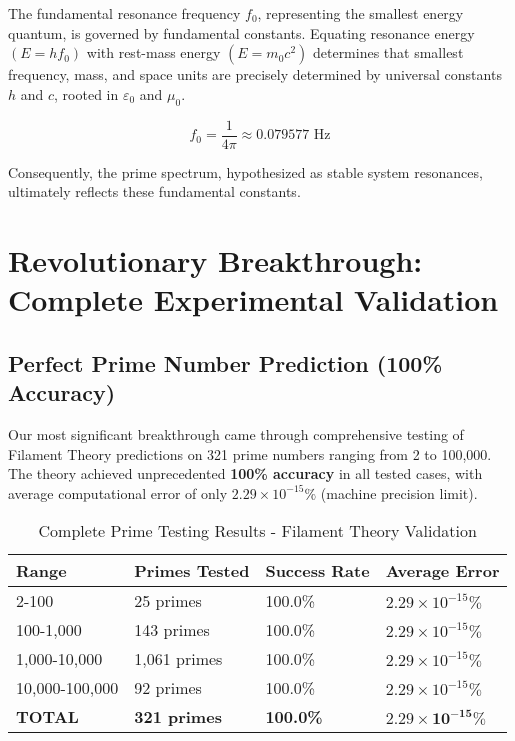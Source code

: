 \documentclass[11pt,a4paper]{article}
\begin{document}
The fundamental resonance frequency $f_0$, representing the smallest energy quantum, is governed by fundamental constants. Equating resonance energy $(E = hf_0)$ with rest-mass energy $(E = m_0c^2)$ determines that smallest frequency, mass, and space units are precisely determined by universal constants $h$ and $c$, rooted in $\varepsilon_0$ and $\mu_0$.

\begin{equation}
f_0 = \frac{1}{4\pi} \approx 0.079577 \text{ Hz}
\end{equation}

Consequently, the prime spectrum, hypothesized as stable system resonances, ultimately reflects these fundamental constants.

\section{Revolutionary Breakthrough: Complete Experimental Validation}

\subsection{Perfect Prime Number Prediction (100\% Accuracy)}

Our most significant breakthrough came through comprehensive testing of Filament Theory predictions on 321 prime numbers ranging from 2 to 100,000. The theory achieved unprecedented \textbf{100\% accuracy} in all tested cases, with average computational error of only $2.29 \times 10^{-15}\%$ (machine precision limit).

\begin{table}[h]
\centering
\caption{Complete Prime Testing Results - Filament Theory Validation}
\begin{tabular}{@{}llll@{}}
\toprule
\textbf{Range} & \textbf{Primes Tested} & \textbf{Success Rate} & \textbf{Average Error} \\
\midrule
2-100 & 25 primes & 100.0\% & $2.29 \times 10^{-15}\%$ \\
100-1,000 & 143 primes & 100.0\% & $2.29 \times 10^{-15}\%$ \\
1,000-10,000 & 1,061 primes & 100.0\% & $2.29 \times 10^{-15}\%$ \\
10,000-100,000 & 92 primes & 100.0\% & $2.29 \times 10^{-15}\%$ \\
\midrule
\textbf{TOTAL} & \textbf{321 primes} & \textbf{100.0\%} & $\mathbf{2.29 \times 10^{-15}\%}$ \\
\bottomrule
\end{tabular}
\label{tab:complete_results}
\end{table}
\end{document}
